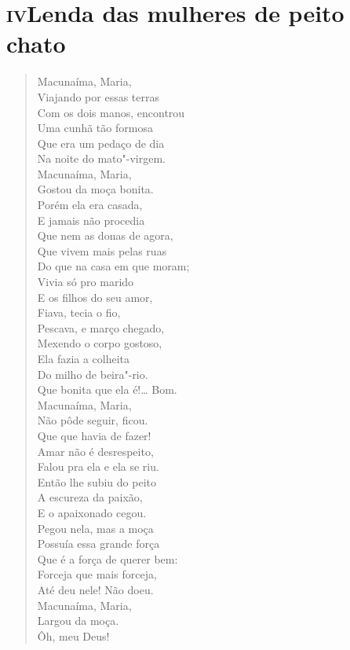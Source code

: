 \pagebreak
{}
\section*{\textsc{iv}\break Lenda das mulheres de peito chato}

\begin{verse}
Macunaíma, Maria,\\
Viajando por essas terras\\
Com os dois manos, encontrou\\
Uma cunhã tão formosa\\
Que era um pedaço de dia\\
Na noite do mato"-virgem.\\
Macunaíma, Maria,\\
Gostou da moça bonita.\\
Porém ela era casada,\\
E jamais não procedia\\
Que nem as donas de agora,\\
Que vivem mais pelas ruas\\
Do que na casa em que moram;\\
Vivia só pro marido\\
E os filhos do seu amor,\\
Fiava, tecia o fio,\\
Pescava, e março chegado,\\
Mexendo o corpo gostoso,\\
Ela fazia a colheita\\
Do milho de beira"-rio.\\
Que bonita que ela é!\ldots{} Bom.\\
Macunaíma, Maria,\\
Não pôde seguir, ficou.\\
Que que havia de fazer!\\
Amar não é desrespeito,\\
Falou pra ela e ela se riu.\\
Então lhe subiu do peito\\
A escureza da paixão,\\
E o apaixonado cegou.\\
Pegou nela, mas a moça\\
Possuía essa grande força\\
Que é a força de querer bem:\\
Forceja que mais forceja,\\
Até deu nele! Não doeu.\\
Macunaíma, Maria,\\
Largou da moça.\\
\qquad\qquad\qquad{}Ôh, meu Deus!


\end{verse}

